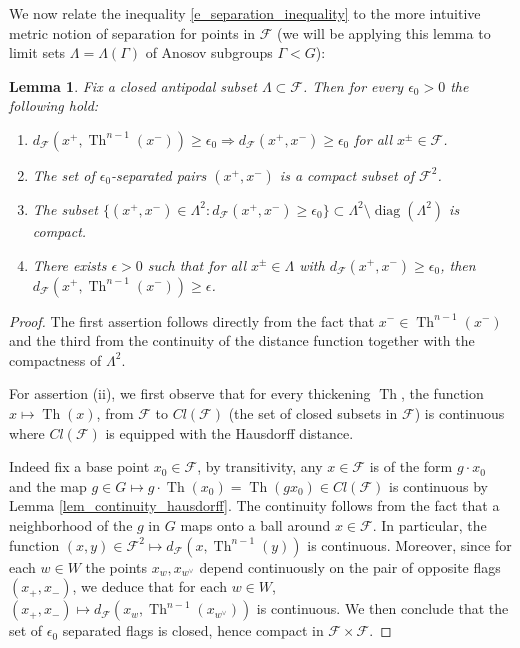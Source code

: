 \documentclass[12pt]{amsbook}%
\newtheorem{lem}[thm]{Lemma}
\theoremstyle{definition}
\theoremstyle{remark}
\numberwithin{section}{chapter}
\numberwithin{subsection}{section}
\numberwithin{figure}{chapter}
\DeclareMathOperator{\Th}{Th}
\DeclareMathOperator{\diag}{diag}
\def\eps{\epsilon}
\def\dF{d_{\mathcal{F}}}
\def\cF{{\mathscr{F}}}
\def\Ga{\Gamma}
\def\La{\Lambda}
\begin{document}
{{\medskip 
We now relate the inequality \eqref{e_separation_inequality} to the more intuitive metric notion of separation for points in $\cF$ (we will be applying this lemma to limit sets $\La=\La(\Ga)$ of Anosov subgroups $\Ga< G$): 

\begin{lem}\label{lem:separate} 
Fix a closed antipodal subset $\La\subset \cF$. Then  
for every $\eps_0>0$ the following hold: 

\begin{enumerate}
\item[(i)] $d_{\cF}(x^+, \Th^{n-1}(x^-))\geqslant \eps_0\Rightarrow  d_{\cF}(x^+, x^-)\geqslant \eps_0$ for all $x^\pm \in \cF$. 
\item[(ii)] The set of $\eps_0$-separated pairs $(x^+,x^-)$ is a compact subset of $\cF^2$.
\item[(iii)]The subset $\{(x^+, x^-)\in \La^2: \dF(x^+, x^-)\geqslant \eps_0\}\subset \La^2\setminus \diag(\La^2)$ is compact.   
\item[(iv)] There exists $\epsilon>0$ such that for all $x^\pm \in \La$ with $d_{\cF}(x^+, x^-)\geqslant \eps_0$,  then $d_{\cF}(x^+, \Th^{n-1}(x^-))\geqslant \epsilon$.
\end{enumerate}
\end{lem}

\begin{proof} The first assertion follows directly from  the fact that  $x^-\in \Th^{n-1}(x^-)$ and the third from the continuity of the distance function together with the compactness of $\Lambda^2$.

For assertion (ii), we first observe that for every thickening $\Th$, the function $x\mapsto \Th(x)$, from $\cF$ to $Cl(\cF)$ (the set  
of closed subsets in $\cF$)  is continuous where $Cl(\cF)$ is equipped with the Hausdorff distance. 

Indeed fix a base point $x_0\in \cF$, by transitivity, any $x \in \cF$ is of the form $g \cdot x_0$ and the map $g \in G \mapsto g \cdot \Th(x_0) = \Th(g x_0) \in Cl(\cF)$ is continuous by Lemma \ref{lem_continuity_hausdorff}. The continuity follows from the fact that a neighborhood of the $g$ in $G$ maps onto a ball around $x \in \cF$. 
In particular, the function $(x,y) \in \cF^2 \mapsto d_{\cF}(x, \Th^{n-1}(y))$ is continuous. Moreover, since for each $w\in W$ the points $x_w, x_{w^\vee}$ depend continuously on the pair of opposite flags $(x_+,x_-)$, we deduce that for each $w \in W$, $(x_+, x_-) \mapsto d_{\cF}(x_w , \Th^{n-1}(x_{w^\vee}))$ is continuous. 
We then conclude that the set of $\epsilon_0$ separated flags is closed, hence compact in $\cF \times \cF$.
%
\smallskip 


\end{proof}}}
\end{document}
